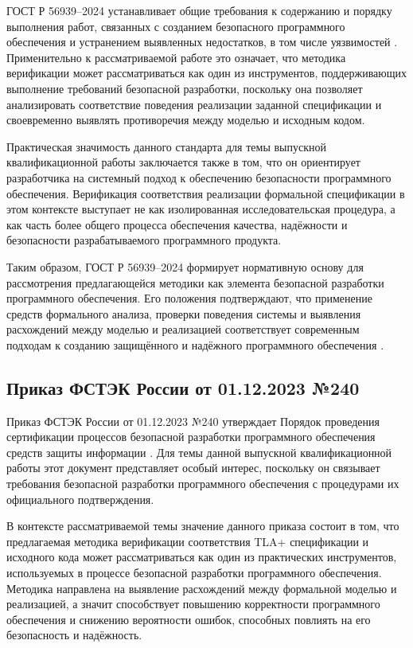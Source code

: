 ГОСТ Р 56939--2024 устанавливает общие требования к содержанию и порядку
выполнения работ, связанных с созданием безопасного программного
обеспечения и устранением выявленных недостатков, в том числе
уязвимостей \cite{gost_56939_2024}. Применительно к рассматриваемой работе
это означает, что методика верификации может рассматриваться как один из
инструментов, поддерживающих выполнение требований безопасной разработки,
поскольку она позволяет анализировать соответствие поведения реализации
заданной спецификации и своевременно выявлять противоречия между моделью и
исходным кодом.

Практическая значимость данного стандарта для темы выпускной
квалификационной работы заключается также в том, что он ориентирует
разработчика на системный подход к обеспечению безопасности программного
обеспечения. Верификация соответствия реализации формальной спецификации в
этом контексте выступает не как изолированная исследовательская процедура,
а как часть более общего процесса обеспечения качества, надёжности и
безопасности разрабатываемого программного продукта.

Таким образом, ГОСТ Р 56939--2024 формирует нормативную основу для
рассмотрения предлагающейся методики как элемента безопасной разработки
программного обеспечения. Его положения подтверждают, что применение
средств формального анализа, проверки поведения системы и выявления
расхождений между моделью и реализацией соответствует современным
подходам к созданию защищённого и надёжного программного обеспечения
\cite{gost_56939_2024}.

\subsection{Приказ ФСТЭК России от 01.12.2023 №240}

Приказ ФСТЭК России от 01.12.2023 №240 утверждает Порядок проведения
сертификации процессов безопасной разработки программного обеспечения
средств защиты информации \cite{fstek_240_2023}. Для темы данной выпускной
квалификационной работы этот документ представляет особый интерес,
поскольку он связывает требования безопасной разработки программного
обеспечения с процедурами их официального подтверждения.

В контексте рассматриваемой темы значение данного приказа состоит в том,
что предлагаемая методика верификации соответствия TLA+ спецификации и
исходного кода может рассматриваться как один из практических инструментов,
используемых в процессе безопасной разработки программного обеспечения.
Методика направлена на выявление расхождений между формальной моделью и
реализацией, а значит способствует повышению корректности программного
обеспечения и снижению вероятности ошибок, способных повлиять на его
безопасность и надёжность.

